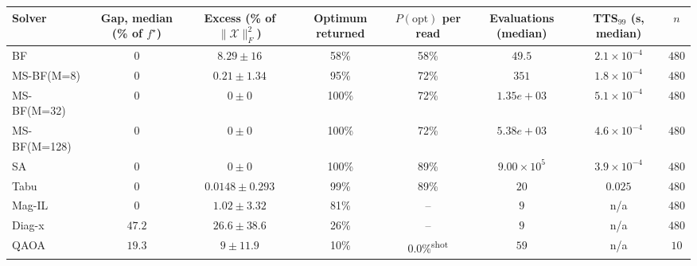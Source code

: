 \begin{longtable}{@{}lccccccc@{}}
\toprule
Solver & Gap, median (\% of \(f^\star\)) & Excess (\% of \(\|\mathcal X\|_F^2\)) & Optimum returned & \(P(\text{opt})\) per read & Evaluations (median) & TTS\(_{99}\) (s, median) & \(n\) \\
\midrule
\endhead
BF & \(0\) & \(8.29 \pm 16\) & 58\% & 58\% & \(49.5\) & \(2.1{\times}10^{-4}\) & \(480\) \\
MS-BF(M=8) & \(0\) & \(0.21 \pm 1.34\) & 95\% & 72\% & \(351\) & \(1.8{\times}10^{-4}\) & \(480\) \\
MS-BF(M=32) & \(0\) & \(0 \pm 0\) & 100\% & 72\% & \(1.35e+03\) & \(5.1{\times}10^{-4}\) & \(480\) \\
MS-BF(M=128) & \(0\) & \(0 \pm 0\) & 100\% & 72\% & \(5.38e+03\) & \(4.6{\times}10^{-4}\) & \(480\) \\
SA & \(0\) & \(0 \pm 0\) & 100\% & 89\% & \(9.00{\times}10^{5}\) & \(3.9{\times}10^{-4}\) & \(480\) \\
Tabu & \(0\) & \(0.0148 \pm 0.293\) & 99\% & 89\% & \(20\) & \(0.025\) & \(480\) \\
Mag-IL & \(0\) & \(1.02 \pm 3.32\) & 81\% & -- & \(9\) & n/a & \(480\) \\
Diag-x & \(47.2\) & \(26.6 \pm 38.6\) & 26\% & -- & \(9\) & n/a & \(480\) \\
QAOA & \(19.3\) & \(9 \pm 11.9\) & 10\% & 0.0\%\textsuperscript{shot} & \(59\) & n/a & \(10\) \\
\bottomrule
\end{longtable}
